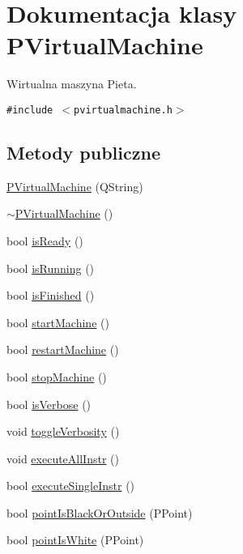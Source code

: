 \hypertarget{classPVirtualMachine}{
\section{Dokumentacja klasy PVirtualMachine}
\label{classPVirtualMachine}
}
Wirtualna maszyna Pieta.  


{\tt \#include $<$pvirtualmachine.h$>$}

\subsection*{Metody publiczne}
\begin{CompactItemize}
\item 
\hyperlink{classPVirtualMachine_0af0326622a3f47b6c2020413cdd3e05}{PVirtualMachine} (QString)
\item 
\hyperlink{classPVirtualMachine_4b24d240f1a45515cf4c8d4df932da62}{$\sim$PVirtualMachine} ()
\item 
bool \hyperlink{classPVirtualMachine_5132bedd5e8480185b48ea6c4783c770}{isReady} ()
\item 
bool \hyperlink{classPVirtualMachine_823195d3ae1615c791dfeb6c8d365a0e}{isRunning} ()
\item 
bool \hyperlink{classPVirtualMachine_6b19e3e51a584b13e79c44fc5b842c2b}{isFinished} ()
\item 
bool \hyperlink{classPVirtualMachine_4b6bb128d63569e855684128b5e09f1c}{startMachine} ()
\item 
bool \hyperlink{classPVirtualMachine_f4cdf5d80b7a169e2dfdebffe2588e4b}{restartMachine} ()
\item 
bool \hyperlink{classPVirtualMachine_fa30f1871832c1af18519db03c397ac0}{stopMachine} ()
\item 
bool \hyperlink{classPVirtualMachine_219cd1d08de6d3d5a9117eecc5348d9c}{isVerbose} ()
\item 
void \hyperlink{classPVirtualMachine_1e48dcf68b3b80d7f6d3c67b3f796e51}{toggleVerbosity} ()
\item 
void \hyperlink{classPVirtualMachine_40e1780e122ce7fe4ebadc526c47fbea}{executeAllInstr} ()
\item 
bool \hyperlink{classPVirtualMachine_7bbb22aabe782de2208139bc01f65050}{executeSingleInstr} ()
\item 
bool \hyperlink{classPVirtualMachine_6daa9fea05af4bfc30b881c893fbd725}{pointIsBlackOrOutside} (PPoint)
\item 
bool \hyperlink{classPVirtualMachine_cae537f70c35487220818e8d18978e07}{pointIsWhite} (PPoint)

\end{CompactItemize}
